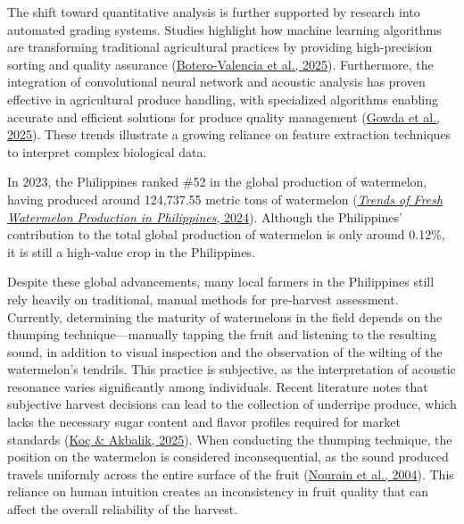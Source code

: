 \begin{thesisprose}
The shift toward quantitative analysis is further supported by research into automated grading systems. Studies highlight how machine learning algorithms are transforming traditional agricultural practices by providing high-precision sorting and quality assurance (\hyperlink{cite.boterovalencia2025}{Botero-Valencia et al., 2025}). Furthermore, the integration of convolutional neural network and acoustic analysis has proven effective in agricultural produce handling, with specialized algorithms enabling accurate and efficient solutions for produce quality management (\hyperlink{cite.gowda2025}{Gowda et al., 2025}). These trends illustrate a growing reliance on feature extraction techniques to interpret complex biological data.

In 2023, the Philippines ranked \#52 in the global production of watermelon, having produced around 124,737.55 metric tons of watermelon (\hyperlink{cite.trends2024}{\textit{Trends of Fresh Watermelon Production in Philippines}, 2024}). Although the Philippines’ contribution to the total global production of watermelon is only around 0.12\%, it is still a high-value crop in the Philippines.

Despite these global advancements, many local farmers in the Philippines still rely heavily on traditional, manual methods for pre-harvest assessment. Currently, determining the maturity of watermelons in the field depends on the thumping technique—manually tapping the fruit and listening to the resulting sound, in addition to visual inspection and the observation of the wilting of the watermelon’s tendrils. This practice is subjective, as the interpretation of acoustic resonance varies significantly among individuals. Recent literature notes that subjective harvest decisions can lead to the collection of underripe produce, which lacks the necessary sugar content and flavor profiles required for market standards (\hyperlink{cite.koc2025}{Koç \& Akbalik, 2025}). When conducting the thumping technique, the position on the watermelon is considered inconsequential, as the sound produced travels uniformly across the entire surface of the fruit (\hyperlink{cite.nourain2004}{Nourain et al., 2004}). This reliance on human intuition creates an inconsistency in fruit quality that can affect the overall reliability of the harvest.


\end{thesisprose}
